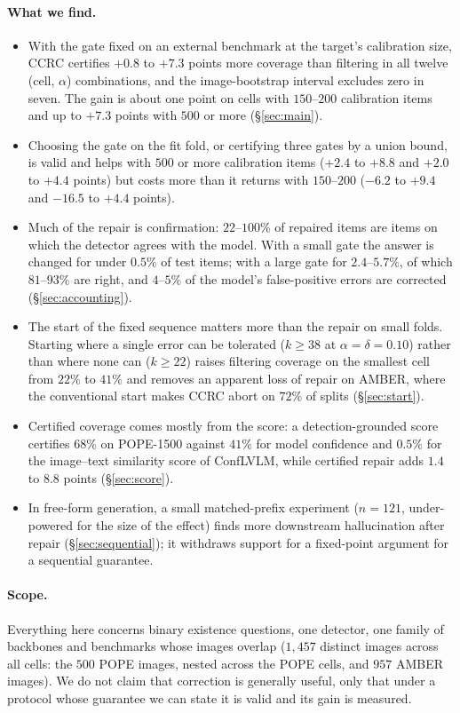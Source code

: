 \paragraph{What we find.}
\begin{itemize}
\item With the gate fixed on an external benchmark at the target's calibration size, CCRC certifies $+0.8$ to $+7.3$ points
  more coverage than filtering in all twelve (cell, $\alpha$) combinations, and the image-bootstrap interval excludes zero in
  seven. The gain is about one point on cells with $150$--$200$ calibration items and up to $+7.3$ points with $500$ or more
  (\S\ref{sec:main}).
\item Choosing the gate on the fit fold, or certifying three gates by a union bound, is valid and helps with $500$ or more calibration
  items ($+2.4$ to $+8.8$ and $+2.0$ to $+4.4$ points) but costs more than it returns with $150$--$200$
  ($-6.2$ to $+9.4$ and $-16.5$ to $+4.4$ points).
\item Much of the repair is confirmation: $22$--$100\%$ of repaired items are items on which the detector agrees with the model.
  With a small gate the answer is changed for under $0.5\%$ of test items; with a large gate for $2.4$--$5.7\%$, of which $81$--$93\%$
  are right, and $4$--$5\%$ of the model's false-positive errors are corrected (\S\ref{sec:accounting}).
\item The start of the fixed sequence matters more than the repair on small folds. Starting where a single error can be
  tolerated ($k\ge38$ at $\alpha=\delta=0.10$) rather than where none can ($k\ge22$) raises filtering coverage on the smallest cell
  from $22\%$ to $41\%$ and removes an apparent loss of repair on AMBER, where the conventional start makes CCRC abort on $72\%$
  of splits (\S\ref{sec:start}).
\item Certified coverage comes mostly from the score: a detection-grounded score certifies $68\%$ on POPE-1500 against $41\%$ for
  model confidence and $0.5\%$ for the image--text similarity score of ConfLVLM, while certified repair adds $1.4$ to $8.8$ points
  (\S\ref{sec:score}).
\item In free-form generation, a small matched-prefix experiment ($n=121$, under-powered for the size of the effect) finds more downstream
  hallucination after repair (\S\ref{sec:sequential}); it withdraws support for a fixed-point argument for a sequential guarantee.
\end{itemize}

\paragraph{Scope.}
Everything here concerns binary existence questions, one detector, one family of backbones and
benchmarks whose images overlap ($1{,}457$ distinct images across all cells: the $500$ POPE images, nested across the POPE cells, and $957$ AMBER images). We do not claim that correction is
generally useful, only that under a protocol whose guarantee we can state it is valid and its
gain is measured.
